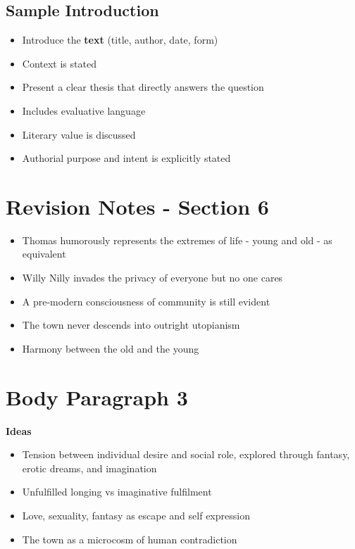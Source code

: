 	\subsection{Sample Introduction}
	
		\begin{itemize}
			\item Introduce the \textbf{text} (title, author, date, form)
			\item Context is stated
			\item Present a clear thesis that directly answers the question
			\item Includes evaluative language
			\item Literary value is discussed
			\item Authorial purpose and intent is explicitly stated
		\end{itemize}

\section{Revision Notes - Section 6}

	\begin{itemize}
		\item Thomas humorously represents the extremes of life - young and old - as equivalent
		\item Willy Nilly invades the privacy of everyone but no one cares
		\item A pre-modern consciousness of community is still evident
		\item The town never descends into outright utopianism
		\item Harmony between the old and the young
	\end{itemize}

\section{Body Paragraph 3} \label{30/05/2025}
	
	\textbf{Ideas}

		\begin{itemize}
			\item Tension between individual desire and social role, explored through fantasy, erotic dreams, and imagination
			\item Unfulfilled longing vs imaginative fulfilment
			\item Love, sexuality, fantasy as escape and self expression
			\item The town as a microcosm of human contradiction
		\end{itemize}

